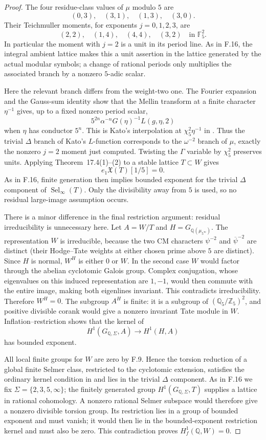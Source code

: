 \begin{proof}
The four residue-class values of $\mu$ modulo $5$ are
\[
 (0,3),\quad(3,1),\quad(1,3),\quad(3,0).
\]
Their Teichmuller moments, for exponents $j=0,1,2,3$, are
\[
 (2,2),\quad(1,4),\quad(4,4),\quad(3,2)
       \quad\text{in }\mathbb F_5^2.
\]
In particular the moment with $j=2$ is a unit in its period
line. As in F.16, the integral ambient lattice makes this a
unit assertion in the lattice generated by the actual modular
symbols; a change of rational periods only multiplies the
associated branch by a nonzero $5$-adic scalar.

Here the relevant branch differs from the weight-two one.
The Fourier expansion and the Gauss-sum identity show that
the Mellin transform at a finite character $\eta^{-1}$ gives,
up to a fixed nonzero period scalar,
\[
 5^{2n}\alpha^{-n}G(\eta)^{-1}L(g,\eta,2)
\]
when $\eta$ has conductor $5^n$. This is Kato's interpolation
at $\chi_5^2\eta^{-1}$ in
\citet[Theorem~16.2, with $r=k-1=2$]{FA_Kato2004}.
Thus the trivial $\Delta$ branch of Kato's $L$-function
corresponds to the $\omega^{-2}$ branch of $\mu$, exactly
the nonzero $j=2$ moment just computed. Twisting the $\Gamma$
variable by $\chi_5^2$ preserves units. Applying
Theorem~17.4(1)--(2) to a stable lattice $T\subset W$ gives
\[
 e_1\mathfrak X(T)[1/5]=0.
\]
As in F.16, finite generation then implies bounded exponent
for the trivial $\Delta$ component of $\operatorname{Sel}_\infty(T)$.
Only the divisibility away from $5$ is used, so no residual
large-image assumption occurs.

There is a minor difference in the final restriction argument:
residual irreducibility is unnecessary here. Let
$A=W/T$ and $H=G_{\mathbb Q(\mu_{5^\infty})}$.
The representation $W$ is irreducible, because the two CM
characters $\psi^{-2}$ and $\overline\psi^{-2}$ are distinct
(their Hodge--Tate weights at either chosen prime above $5$
are distinct). Since $H$ is normal, $W^H$ is either $0$ or $W$.
In the second case $W$ would factor through the abelian
cyclotomic Galois group. Complex conjugation, whose eigenvalues
on this induced representation are $1,-1$, would then commute
with the entire image, making both eigenlines invariant.
This contradicts irreducibility. Therefore $W^H=0$.
The subgroup $A^H$ is finite: it is a subgroup of
$(\mathbb Q_5/\mathbb Z_5)^2$, and positive divisible corank
would give a nonzero invariant Tate module in $W$.
Inflation--restriction shows that the kernel of
\[
 H^1(G_{\mathbb Q,\Sigma},A)\longrightarrow H^1(H,A)
\]
has bounded exponent.

All local finite groups for $W$ are zero by F.9. Hence the
torsion reduction of a global finite Selmer class, restricted
to the cyclotomic extension, satisfies the ordinary kernel
condition in \citet[Proposition~17.2]{FA_Kato2004} and lies in
the trivial $\Delta$ component. As in F.16 we fix
$\Sigma=\{2,3,5,\infty\}$; the finitely generated group
$H^1(G_{\mathbb Q,\Sigma},T)$ supplies a lattice in rational
cohomology. A nonzero rational Selmer subspace would therefore
give a nonzero divisible torsion group. Its restriction lies
in a group of bounded exponent and must vanish; it would
then lie in the bounded-exponent restriction kernel and must
also be zero. This contradiction proves
$H_f^1(\mathbb Q,W)=0$.


\end{proof}
